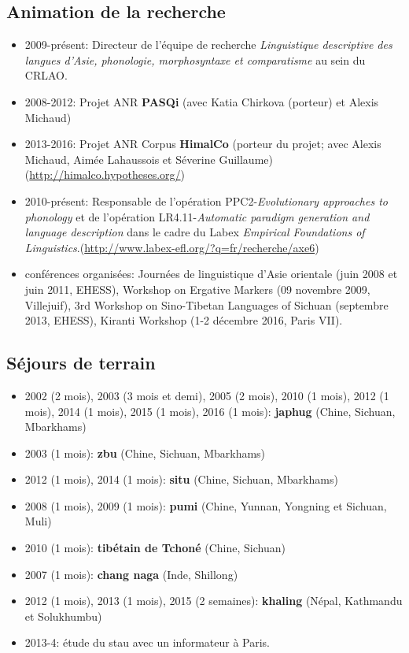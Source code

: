 \documentclass[oldfontcommands,oneside,a4paper,11pt]{article}
\begin{document}
\subsection*{Animation de la recherche}
\begin{itemize}
\item 2009-présent: Directeur de l'équipe de recherche \textit{Linguistique descriptive des langues d’Asie, phonologie, morphosyntaxe et comparatisme} au sein du CRLAO.
\item 2008-2012: Projet ANR \textbf{PASQi} (avec Katia Chirkova (porteur) et Alexis Michaud) 
\item  2013-2016: Projet ANR Corpus \textbf{HimalCo} (porteur du projet; avec Alexis Michaud, Aimée Lahaussois et Séverine Guillaume) (\url{http://himalco.hypotheses.org/})
\item 2010-présent: Responsable de l'opération PPC2-\textit{Evolutionary approaches to phonology} et de l'opération LR4.11-\textit{Automatic paradigm generation and language description} dans le cadre du Labex \textit{Empirical Foundations of Linguistics}.(\url{http://www.labex-efl.org/?q=fr/recherche/axe6})
\item conférences organisées: Journées de linguistique d'Asie orientale (juin 2008 et juin 2011, EHESS),  Workshop on Ergative Markers (09 novembre 2009, Villejuif), 3rd Workshop on Sino-Tibetan Languages of Sichuan (septembre 2013, EHESS), Kiranti Workshop (1-2 décembre 2016, Paris VII).
\end{itemize}
\subsection*{Séjours de terrain} 
\begin{itemize}
\item   2002 (2 mois), 2003 (3 mois et demi), 2005 (2 mois), 2010 (1 mois), 2012 (1 mois), 2014 (1 mois), 2015 (1 mois), 2016 (1 mois): \textbf{japhug} (Chine, Sichuan, Mbarkhams)
\item  2003 (1 mois): \textbf{zbu} (Chine, Sichuan, Mbarkhams)
\item  2012 (1 mois), 2014 (1 mois): \textbf{situ} (Chine, Sichuan, Mbarkhams)
\item  2008 (1 mois), 2009 (1 mois): \textbf{pumi} (Chine, Yunnan, Yongning et Sichuan, Muli)
\item  2010 (1 mois): \textbf{tibétain de Tchoné} (Chine, Sichuan)
\item  2007 (1 mois): \textbf{chang naga} (Inde, Shillong)
\item  2012 (1 mois), 2013 (1 mois), 2015 (2 semaines): \textbf{khaling} (Népal, Kathmandu et Solukhumbu)
\item 2013-4: étude du stau avec un informateur à Paris.
  \end{itemize}
  
\end{document}
